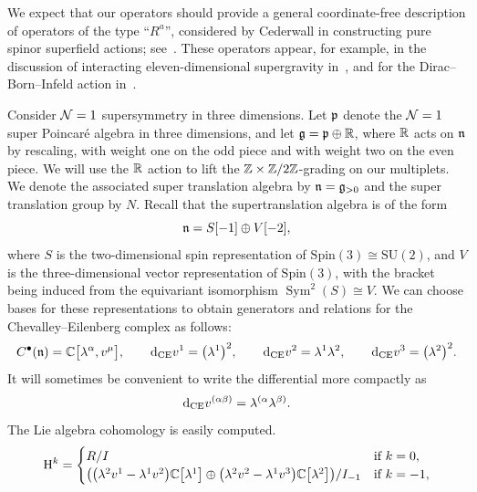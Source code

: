 \documentclass[pdftex]{sigma}
\numberwithin{equation}{section}
\def\d{{\rm d}}
\DeclareMathOperator{\Sym}{Sym}
\begin{document}
We expect that our operators should provide a general coordinate-free description of operators of the type ``$R^a$'', considered by Cederwall in constructing pure spinor superfield actions; see~\cite{Ced-ops}. These operators appear, for example, in the discussion of interacting eleven-dimensional supergravity in~\cite{Ced-11d, Ced-towards}, and for the Dirac--Born--Infeld action in~\cite{CederwallKarlsson}.

\begin{eg}
	Consider $\mathcal N=1$ supersymmetry in three dimensions. Let $\mathfrak p$ denote the $\mathcal N=1$ super Poincar\'e algebra in three dimensions, and let $\mathfrak g = \mathfrak p \oplus \mathbb R$, where $\mathbb R$ acts on $\mathfrak n$ by rescaling, with weight one on the odd piece and with weight two on the even piece. We will use the $\mathbb R$ action to lift the $\mathbb Z \times \mathbb Z/2\mathbb Z$-grading on our multiplets. We denote the associated super translation algebra by $\mathfrak n= \mathfrak g_{>0}$ and the super translation group by $N$.
	Recall that the supertranslation algebra is of the form
	\begin{equation*}
	\mathfrak n = S[-1] \oplus V[-2],
	\end{equation*}
	where $S$ is the two-dimensional spin representation of $\mathrm{Spin}(3) \cong \mathrm{SU}(2)$, and $V$ is the three-dimensional vector representation of $\mathrm{Spin}(3)$, with the bracket being induced from the equivariant isomorphism $\Sym^2(S) \cong V$. We can choose bases for these representations to obtain generators and relations for the Chevalley--Eilenberg complex as follows:
	\begin{equation*}
	C^\bullet(\fn) = \CC\big[\lambda^\alpha , v^\mu\big], \qquad \d_{\mathrm{CE}}v^1 = \big(\lambda^1\big)^2 ,\qquad \d_{\mathrm{CE}}v^2 = \lambda^1 \lambda^2, \qquad \d_{\mathrm{CE}}v^3 = \big(\lambda^2\big)^2 .
	\end{equation*}
	It will sometimes be convenient to write the differential more compactly as
	\begin{equation*}
	\d_{\mathrm{CE}}v^{(\alpha \beta)} = \lambda^{(\alpha} \lambda^{\beta)} .
	\end{equation*}
	The Lie algebra cohomology is easily computed.
	\begin{equation*}
	\mathrm H^k = \begin{cases}
	R/I & \text{if } k=0, \\
	\big(\big(\lambda^2 v^1 - \lambda^1 v^2\big) \mathbb C\big[\lambda^1\big] \oplus \big(\lambda^2 v^2 - \lambda^1 v^3\big) \mathbb C\big[\lambda^2\big] \big)/ I_{-1} & \text{if } k=-1, \\

\end{cases}
\end{equation*}
\end{eg}
\end{document}
